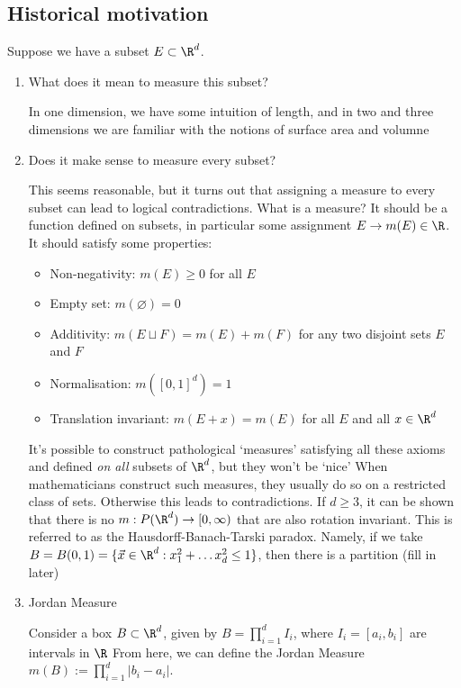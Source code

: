\documentclass{article}
\begin{document}
\subsection{Historical motivation}
Suppose we have a subset $E \subset \R^d$.
\begin{enumerate}
    \item What does it mean to measure this subset?

        In one dimension, we have some intuition of length, and in two and three dimensions we are familiar with the notions of surface area and volumne

    \item Does it make sense to measure every subset?

        This seems reasonable, but it turns out that assigning a measure to every subset can lead to logical contradictions.
        What is a measure? It should be a function defined on subsets, in particular some assignment $E \to m(E) \in \R$.  It should satisfy some properties:
        \begin{itemize}
            \item Non-negativity: $m(E) \geq 0$ for all $E$
            \item Empty set: $m(\varnothing) = 0$
            \item Additivity: $m(E \sqcup F) = m(E) + m(F)$ for any two disjoint sets $E$ and $F$
            \item Normalisation: $m([0, 1]^d) = 1$
            \item Translation invariant: $m(E + x) = m(E)$ for all $E$ and all $x \in \R^d$
        \end{itemize}
        It's possible to construct pathological `measures' satisfying all these axioms and defined \emph{on all} subsets of $\R^d$, but they won't be `nice'
        When mathematicians construct such measures, they usually do so on a restricted class of sets. Otherwise this leads to contradictions.
        If $d \geq 3$, it can be shown that there is no $m: P(\R^d) \to [0, \infty)$ that are also rotation invariant.  This is referred to as the Hausdorff-Banach-Tarski paradox.
        Namely, if we take $B = B(0, 1) = \{\vec{x} \in \R^d: x_1^2 + \dots x_d^2 \leq 1\}$, then there is a partition (fill in later)

    \item Jordan Measure

        Consider a box $B \subset \R^d$, given by $B = \prod_{i=1}^d I_i$, where $I_i = [a_i, b_i]$ are intervals in $\R$
        From here, we can define the Jordan Measure $m(B) := \prod_{i=1}^d |b_i - a_i|$.


\end{enumerate}
\end{document}
